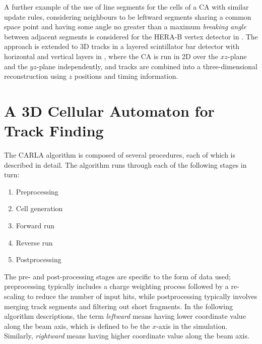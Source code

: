 A further example of the use of line segments for the cells of a \ac{CA} with similar update rules, considering neighbours to be leftward segments sharing a common space point and having some angle no greater than a maximum \emph{breaking angle} between adjacent segments is considered for the HERA-B vertex detector in \citep{Abt2002}. The approach is extended to 3D tracks in a layered scintillator bar detector with horizontal and vertical layers in \citep{Maesaka2005}, where the \ac{CA} is run in 2D over the $xz$-plane and the $yz$-plane independently, and tracks are combined into a three-dimensional reconstruction using $z$ positions and timing information.

\section{A 3D Cellular Automaton for Track Finding}\label{sec:cellularautomaton_algorithm}
The \ac{CARLA} algorithm is composed of several procedures, each of which is described in detail. The algorithm runs through each of the following stages in turn:

\begin{enumerate}
	\item Preprocessing
	\item Cell generation
	\item Forward run
	\item Reverse run
	\item Postprocessing
\end{enumerate}

The pre- and post-processing stages are specific to the form of data used; preprocessing typically includes a charge weighting process followed by a re-scaling to reduce the number of input hits, while postprocessing typically involves merging track segments and filtering out short fragments. In the following algorithm descriptions, the term \emph{leftward} means having lower coordinate value along the beam axis, which is defined to be the $x$-axis in the simulation. Similarly, \emph{rightward} means having higher coordinate value along the beam axis.

